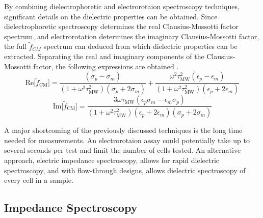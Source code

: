  \par By combining dielectrophoretic and electrorotaion spectroscopy techniques, significant details on the dielectric properties can be obtained. Since dielectrophoretic spectroscopy determines the real Clausius-Mossotti factor spectrum, and electrorotation determines the imaginary Clausius-Mossotti factor, the full $\tilde{f}_{CM}$ spectrum can deduced from which dielectric properties can be extracted. Separating the real and imaginary components of the Clausius-Mossotti factor, the following expressions are obtained \cite{hober_zweites_1912, morgan_single_2007}.
 \begin{equation}
     \text{Re}\big[\tilde{f}_{\text{CM}}\big] = \frac{(\sigma_p - \sigma_m)}{(1+\omega^2\tau_{\text{MW}}^2)(\sigma_p + 2\sigma_m)} + \frac{\omega^2\tau^2_{\text{MW}}(\epsilon_p-\epsilon_m)}{(1+\omega^2\tau_{\text{MW}}^2)(\epsilon_p+2\epsilon_m)}
 \end{equation}
 \begin{equation}
     \text{Im}\big[\tilde{f}_{\text{CM}} \big] = \frac{3\omega\tau_{\text{MW}}(\epsilon_p\sigma_m-\epsilon_m\sigma_p)}{(1+\omega^2\tau^2_{\text{MW}})(\epsilon_p+2\epsilon_m)(\sigma_p+2\sigma_m)}
 \end{equation}
 \par A major shortcoming of the previously discussed techniques is the long time needed for measurements. An electrorotaion assay could potentially take up to several seconds per test and limit the number of cells tested. An alternative approach, electric impedance spectroscopy, allows for rapid dielectric spectroscopy, and with flow-through designs, allows dielectric spectroscopy of every cell in a sample. 
 
 \subsection{Impedance Spectroscopy}
 
